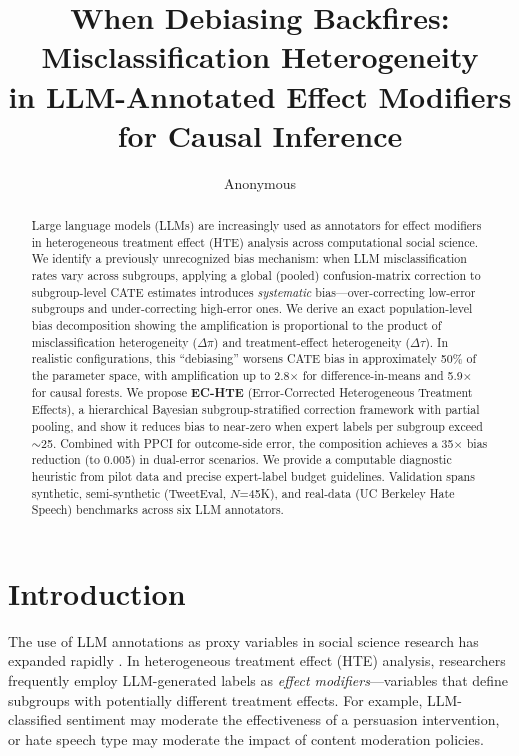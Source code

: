 \documentclass[11pt,a4paper]{article}
\title{When Debiasing Backfires: Misclassification Heterogeneity\\in LLM-Annotated Effect Modifiers for Causal Inference}
\author{Anonymous}
\date{}
\newcommand{\DeltaPi}{\Delta\pi}
\newcommand{\DeltaTau}{\Delta\tau}
\begin{document}
\maketitle

\begin{abstract}
Large language models (LLMs) are increasingly used as annotators for effect modifiers in heterogeneous treatment effect (HTE) analysis across computational social science.
We identify a previously unrecognized bias mechanism: when LLM misclassification rates vary across subgroups, applying a global (pooled) confusion-matrix correction to subgroup-level CATE estimates introduces \emph{systematic} bias---over-correcting low-error subgroups and under-correcting high-error ones.
We derive an exact population-level bias decomposition showing the amplification is proportional to the product of misclassification heterogeneity ($\DeltaPi$) and treatment-effect heterogeneity ($\DeltaTau$).
In realistic configurations, this ``debiasing'' worsens CATE bias in approximately 50\% of the parameter space, with amplification up to 2.8$\times$ for difference-in-means and 5.9$\times$ for causal forests.
We propose \textbf{EC-HTE} (Error-Corrected Heterogeneous Treatment Effects), a hierarchical Bayesian subgroup-stratified correction framework with partial pooling, and show it reduces bias to near-zero when expert labels per subgroup exceed $\sim$25.
Combined with PPCI for outcome-side error, the composition achieves a 35$\times$ bias reduction (to 0.005) in dual-error scenarios.
We provide a computable diagnostic heuristic from pilot data and precise expert-label budget guidelines.
Validation spans synthetic, semi-synthetic (TweetEval, $N$=45K), and real-data (UC Berkeley Hate Speech) benchmarks across six LLM annotators.
\end{abstract}


\section{Introduction}

The use of LLM annotations as proxy variables in social science research has expanded rapidly \citep{gilardi2023chatgpt,tornberg2024chatgpt,ziems2024can}.
In heterogeneous treatment effect (HTE) analysis, researchers frequently employ LLM-generated labels as \emph{effect modifiers}---variables that define subgroups with potentially different treatment effects.
For example, LLM-classified sentiment may moderate the effectiveness of a persuasion intervention, or hate speech type may moderate the impact of content moderation policies.
\end{document}
